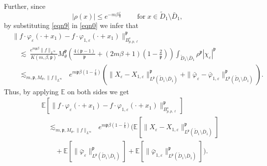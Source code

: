 \documentclass{article}
\newcommand{\tmop}[1]{\ensuremath{\operatorname{#1}}}
\begin{document}
\noindent Further, since
\begin{equation}
  | \rho (x) | \leqslant e^{- m \beta \frac{l}{8}} \qquad \tmop{for} x \in
  \tilde{D}_1 \setminus \bar{D}_1, \label{eqn10}
\end{equation}
by substituting \eqref{eqn9} in \eqref{eqn0} we infer that
%
\begin{align}\label{eqn11}
    & \| f \cdot \varphi_{\varepsilon} (\cdot + x_1) - f \cdot \varphi_{1,
    \varepsilon} (\cdot + x_1) \|_{B_{p, p, \ell}^s}^{\mathfrak{p}} \nonumber \\
    & \quad \lesssim ~ \frac{e^{m\mathfrak{p} \beta} \| f \|_{L^{\infty}}}{K (m,
    \beta, \mathfrak{p})} M_{\theta}^{\mathfrak{p}} \left( \frac{4
    (\mathfrak{p}- 1)}{\mathfrak{p}} + (2 m \beta + 1) \left( 1 -
    \frac{2}{\mathfrak{p}} \right) \right) \int_{\tilde{D}_1 \setminus
    \bar{D}_1} \rho^{\mathfrak{p}}  | \chi_{\varepsilon} |^{\mathfrak{p}} \nonumber \\
    & \quad \lesssim_{m, \mathfrak{p}, M_{\theta}, \| f \|_{L^{\infty}}} ~~ 
    e^{m\mathfrak{p} \beta \left( 1 - \frac{l}{8} \right)} (\| X_{\varepsilon}
    - X_{1, \varepsilon} \|_{L^{\mathfrak{p}} (\tilde{D}_1 \setminus
    \bar{D}_1)}^{\mathfrak{p}} + \| \bar{\varphi}_{\varepsilon} -
    \bar{\varphi}_{1, \varepsilon} \|_{L^{\mathfrak{p}} (\tilde{D}_1 \setminus
    \bar{D}_1)}^{\mathfrak{p}}).
\end{align}
%
Thus, by applying $\mathbb{E}$ on both sides we get
\begin{align}\label{eqn12}
    & \mathbb{E} \left[\| f \cdot \varphi_{\varepsilon} (\cdot + x_1) - f \cdot
    \varphi_{1, \varepsilon} (\cdot + x_1) \|_{B_{p, p,
    \ell}^s}^{\mathfrak{p}} \right] \nonumber \\
	& \quad \lesssim_{m, \mathfrak{p}, M_{\theta}, \| f
    \|_{L^{\infty}}} ~~  e^{m\mathfrak{p} \beta \left( 1 - \frac{l}{8} \right)}
    \bigg( \mathbb{E} \left[\| X_{\varepsilon} - X_{1, \varepsilon} \|_{L^{\mathfrak{p}}
    (\tilde{D}_1 \setminus \bar{D}_1)}^{\mathfrak{p}} \right]  \nonumber \\
    &  \quad \quad   + \mathbb{E} \left[\| \bar{\varphi}_{\varepsilon}
    \|_{L^{\mathfrak{p}} (\tilde{D}_1 \setminus \bar{D}_1)}^{\mathfrak{p}} \right]
    +\mathbb{E} \left[\| \bar{\varphi}_{1, \varepsilon} \|_{L^{\mathfrak{p}}
    (\tilde{D}_1 \setminus \bar{D}_1)}^{\mathfrak{p}} \right] \bigg).
\end{align}
%
\end{document}
